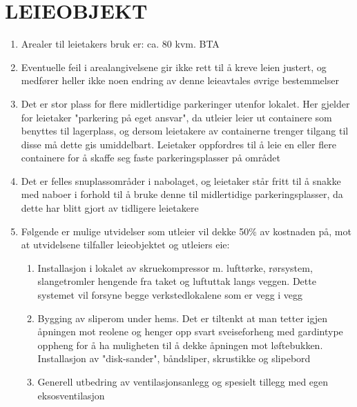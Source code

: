 \section{LEIEOBJEKT}


	\begin{enumerate}


		\item Arealer til leietakers bruk er: ca. 80 kvm. BTA

		\item Eventuelle feil i arealangivelsene gir ikke rett til å kreve leien justert, og medfører heller ikke noen endring av
		denne leieavtales øvrige bestemmelser

		\item Det er stor plass for flere midlertidige parkeringer utenfor lokalet. Her gjelder for leietaker "parkering på eget ansvar", da utleier leier ut containere som benyttes til lagerplass, og dersom leietakere av containerne trenger tilgang til disse må dette gis umiddelbart. Leietaker oppfordres til å leie en eller flere containere for å skaffe seg faste parkeringsplasser på området

		\item Det er felles snuplassområder i nabolaget, og leietaker står fritt til å snakke med naboer i forhold til å bruke denne til midlertidige parkeringsplasser, da dette har blitt gjort av tidligere leietakere

		\item Følgende er mulige utvidelser som utleier vil dekke 50\% av kostnaden på, mot at utvidelsene tilfaller leieobjektet og utleiers eie:

			\begin{enumerate}

				\item Installasjon i lokalet av skruekompressor m. lufttørke, rørsystem, slangetromler hengende fra taket og luftuttak langs veggen. Dette systemet vil forsyne begge verkstedlokalene som er vegg i vegg

				\item Bygging av sliperom under hems. Det er tiltenkt at man tetter igjen åpningen mot reolene og henger opp svart sveiseforheng med gardintype oppheng for å ha muligheten til å dekke åpningen mot løftebukken. Installasjon av "disk-sander", båndsliper, skrustikke og slipebord

				\item Generell utbedring av ventilasjonsanlegg og spesielt tillegg med egen eksosventilasjon


\end{enumerate}
\end{enumerate}
